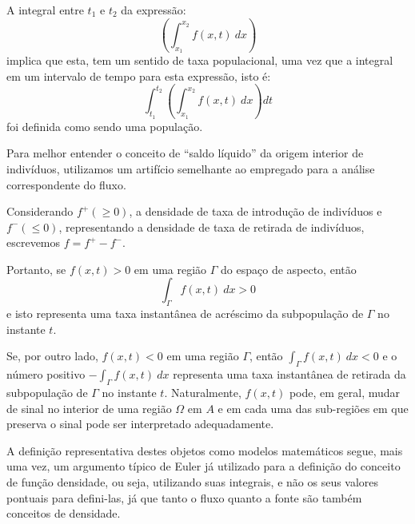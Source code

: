 A integral entre \(t_1\) e \(t_2\) da expressão:
\[\left(\displaystyle\int_{x_1}^{x_2} f(x,t)\ dx\right)\]
implica que esta, tem um sentido de taxa populacional, uma vez que a integral em um intervalo de tempo para esta expressão, isto é:
\[\displaystyle\int_{t_1}^{t_2}\left(\int_{x_1}^{x_2} f(x,t)\ dx\right) dt\]
foi definida como sendo uma população.

Para melhor entender o conceito de ``saldo líquido'' da origem interior de indivíduos, utilizamos um artifício semelhante ao empregado para a análise correspondente do fluxo.

Considerando \(f^+ (\ge 0)\), a densidade de taxa de introdução de indivíduos e \(f^- (\le 0)\), representando a densidade de taxa de retirada de indivíduos, escrevemos \(f = f^+-f^-\).

Portanto, se \(f(x,t) > 0\) em uma região \(\Gamma\) do espaço de aspecto, então
\[\displaystyle\int_\Gamma f(x,t)\ dx > 0\]
e isto representa uma taxa instantânea de acréscimo da subpopulação de \(\Gamma\) no instante \(t\).

Se, por outro lado, \(f(x,t) < 0\) em uma região \(\Gamma\), então \(\displaystyle\int_\Gamma f(x,t)\ dx < 0\) e o número positivo \(-\displaystyle\int_\Gamma f(x,t)\ dx\) representa uma taxa instantânea de retirada da subpopulação de \(\Gamma\) no instante \(t\). Naturalmente, \(f(x,t)\) pode, em geral, mudar de sinal no interior de uma região \(\Omega\) em \(A\) e em cada uma das sub-regiões em que preserva o sinal pode ser interpretado adequadamente.


A definição representativa destes objetos como modelos matemáticos segue, mais uma vez, um argumento típico de Euler já utilizado para a definição do conceito de função densidade, ou seja, utilizando suas integrais, e não os seus valores pontuais para defini-las, já que tanto o fluxo quanto a fonte são também conceitos de densidade.


